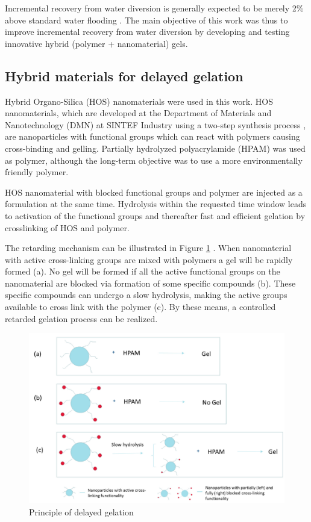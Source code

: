 \documentclass[nanomaterials,article,submit,moreauthors,pdftex]{Definitions/mdpi}
\begin{document}
Incremental recovery from water diversion is generally expected to be merely 2\% above standard water flooding \citep{OG21}. The main objective of this work was thus to improve incremental recovery from water diversion by developing and testing innovative hybrid (polymer + nanomaterial) gels.

\subsection{Hybrid materials for delayed gelation}
Hybrid Organo-Silica (HOS) nanomaterials were used in this work. HOS nanomaterials, which are developed at  the  Department  of  Materials  and  Nanotechnology (DMN) at  SINTEF  Industry using a two-step synthesis process \citep{Mannle2011}, are nanoparticles with functional groups which can react with polymers causing cross-binding and gelling. Partially hydrolyzed polyacrylamide (HPAM)  was used as polymer, although the long-term objective was to use a more environmentally friendly polymer.

HOS nanomaterial with blocked functional groups and polymer are injected as a formulation at the same time. Hydrolysis within the requested time window leads to activation of the functional groups and thereafter fast and efficient gelation by crosslinking of HOS and polymer. 

The retarding mechanism can be illustrated in Figure \ref{fig:twoApproaches} \citep{Najafiazar2016}. When nanomaterial with active cross-linking groups are mixed with polymers a gel will be rapidly formed (a). No gel will be formed if all the active functional groups on the nanomaterial are blocked via formation of some specific compounds (b). These specific compounds can undergo a slow hydrolysis, making the active groups available to cross link with the polymer (c). By these means, a controlled retarded gelation process can be realized. 

\begin{figure}[h!]
    \centering
    \includegraphics[width=.8\textwidth]{fig/twoApproaches.png}
    \caption{Principle of delayed gelation \citep{Najafiazar2016}}
    \label{fig:twoApproaches}
\end{figure}
\end{document}
